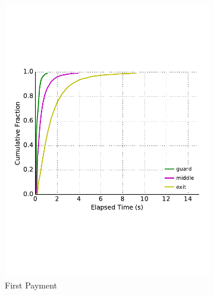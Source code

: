 \begin{figure}
\begin{subfigure}[t]{0.32\textwidth}
\includegraphics[trim={0 3cm 0 3cm}, clip, width=1.0\textwidth]{images/payment_pay.pdf}
		\caption{First Payment}
\label{fig:ttfp}
	\end{subfigure}
	\begin{subfigure}[t]{0.32\textwidth} \centering

\end{subfigure}
\end{figure}
